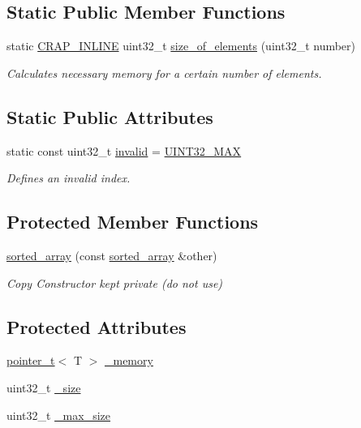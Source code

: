 \subsection*{Static Public Member Functions}
\begin{DoxyCompactItemize}
\item 
static \hyperlink{config__x86_8h_a5a40526b8d842e7ff731509998bb0f1c}{C\+R\+A\+P\+\_\+\+I\+N\+L\+I\+N\+E} uint32\+\_\+t \hyperlink{classcrap_1_1sorted__array_a61c4294fb8cf1f0e0e9306f548988ac8}{size\+\_\+of\+\_\+elements} (uint32\+\_\+t number)
\begin{DoxyCompactList}\small\item\em Calculates necessary memory for a certain number of elements. \end{DoxyCompactList}\end{DoxyCompactItemize}
\subsection*{Static Public Attributes}
\begin{DoxyCompactItemize}
\item 
static const uint32\+\_\+t \hyperlink{classcrap_1_1sorted__array_a9f413d7e9b3f458d98a9c80727886abc}{invalid} = \hyperlink{crap__types_8h_ab5eb23180f7cc12b7d6c04a8ec067fdd}{U\+I\+N\+T32\+\_\+\+M\+A\+X}
\begin{DoxyCompactList}\small\item\em Defines an invalid index. \end{DoxyCompactList}\end{DoxyCompactItemize}
\subsection*{Protected Member Functions}
\begin{DoxyCompactItemize}
\item 
\hyperlink{classcrap_1_1sorted__array_abc66df9473d0f3fd1659f4cce186a9f3}{sorted\+\_\+array} (const \hyperlink{classcrap_1_1sorted__array}{sorted\+\_\+array} \&other)
\begin{DoxyCompactList}\small\item\em Copy Constructor kept private (do not use) \end{DoxyCompactList}\end{DoxyCompactItemize}
\subsection*{Protected Attributes}
\begin{DoxyCompactItemize}
\item 
\hyperlink{structcrap_1_1pointer__t}{pointer\+\_\+t}$<$ T $>$ \hyperlink{classcrap_1_1sorted__array_afa20ac100c5b603d0a522c94e7cd549f}{\+\_\+memory}
\item 
uint32\+\_\+t \hyperlink{classcrap_1_1sorted__array_ad33ca1ee9c30abf81658b3c2773ae9d1}{\+\_\+size}
\item 
uint32\+\_\+t \hyperlink{classcrap_1_1sorted__array_aea8cbb8c465d41aebecdf939113fa993}{\+\_\+max\+\_\+size}
\end{DoxyCompactItemize}


